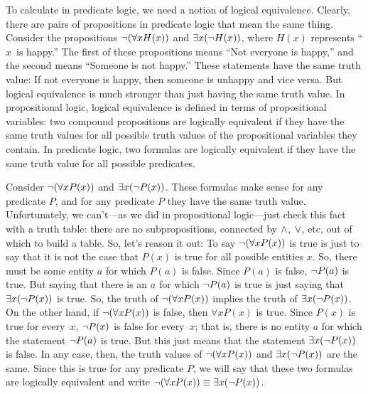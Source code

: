 \medskip

To calculate in predicate logic, we need a notion of logical equivalence.
Clearly, there are pairs of propositions in predicate logic that mean the same
thing.  Consider the propositions $\lnot(\forall x H(x))$ and $\exists x(\lnot H(x))$, where
$H(x)$ represents ``$x$~is happy.'' The first of these propositions means
``Not everyone is happy,'' and the second means ``Someone is not happy.''
These statements have the same truth value:  If not everyone is happy, then someone is
unhappy and vice versa.  But logical equivalence is much stronger than just
having the same truth value.  In propositional logic, logical equivalence
is defined in terms of propositional variables:  two compound propositions
are logically equivalent if they have the same truth values for all possible
truth values of the propositional variables they contain.  In predicate logic, two
formulas are logically equivalent
if they have the same truth value for all
possible predicates.

Consider $\lnot(\forall x P(x))$ and $\exists x(\lnot P(x))$.
These formulas make
sense for any predicate $P$, and for any predicate $P$ they have the same truth
value.  Unfortunately, we can't---as we did in propositional logic---just check
this fact with a truth table: there are no subpropositions, connected by
$\wedge$, $\vee$, etc, out of which to build a table.  So, let's reason it out:
To say $\lnot(\forall x P(x))$ is true is just to say that it is not the case that
$P(x)$ is true for all possible entities $x$.  So, there must be some entity $a$
for which $P(a)$ is false.  Since $P(a)$ is false, $\lnot P(a)$ is true.
But saying that there is an $a$ for which $\lnot P(a)$ is true is just saying
that $\exists x(\lnot P(x))$ is true.  So, the truth of $\lnot(\forall x P(x))$
implies the truth of $\exists x (\lnot P(x))$.  On the other hand, if 
$\lnot(\forall x P(x))$ is false, then $\forall x P(x)$ is true.  Since $P(x)$
is true for every~$x$, $\lnot P(x)$ is false for every~$x$; that is, there is no
entity $a$ for which the statement $\lnot P(a)$ is true.
But this just means that the statement $\exists x(\lnot P(x))$
is false.  In any case, then, the truth values of $\lnot(\forall x P(x))$ and
$\exists x(\lnot P(x))$ are the same.  Since this is true for any predicate $P$,
we will say that these two formulas are logically equivalent and write
$\lnot(\forall x P(x)) \equiv \exists x(\lnot P(x))$.

